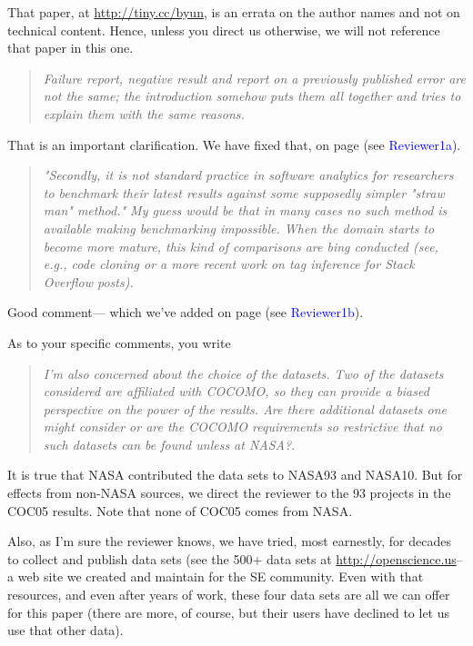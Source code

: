 \documentclass[smallcondesed]{svjour3}
\newcommand{\WHERE}[1]{page \pageref{err:#1} (see \textcolor{blue}{#1})}
\begin{document}
\noindent
That paper, at \url{http://tiny.cc/byun},
is an errata on the author names
and not on technical content. Hence, unless you direct us otherwise,
we will not reference that paper in this one.

\begin{quote}{\em Failure report, negative result and report on a previously published error are not the same; the introduction somehow puts them all together and tries to explain them with the same reasons.}\end{quote}



\noindent
That is an  important clarification.
We have fixed that, on \WHERE{Reviewer1a}.

\begin{quote}{\em "Secondly, it is not standard practice in software analytics for researchers to benchmark their latest results against some supposedly simpler "straw man" method." My guess would be that in many cases no such method is available making benchmarking impossible. When the domain starts to become more mature, this kind of comparisons are bing conducted (see, e.g., code cloning or a more recent work on tag inference for Stack Overflow posts).}\end{quote}

\noindent
Good comment--- which we've added
on \WHERE{Reviewer1b}.




\noindent
As to your specific comments, you write \begin{quote}{\em I'm
  also concerned about the choice of the
  datasets. Two of the datasets considered are
  affiliated with COCOMO, so they can provide a
  biased perspective on the power of the
  results. Are there additional datasets one might
  consider or are the COCOMO requirements so
  restrictive that no such datasets can be found
  unless at NASA?}. \end{quote}
 
 \noindent It is true that NASA contributed the data sets to NASA93 and NASA10.
  But for effects from non-NASA sources, we direct the reviewer to the 93 projects
  in the COC05
  results. Note that none of COC05 comes from NASA.

  Also, as I'm sure the reviewer knows,
  we have tried, most earnestly, for decades to collect
and publish  data sets (see the 
500+ data sets at \url{http://openscience.us}-- a web site we created and maintain for the SE community.
Even with that resources, and even after years of work,
these four data sets are all we can offer for this paper
(there are more, of course, but their users have declined
to let us use that other data).
 
\end{document}
